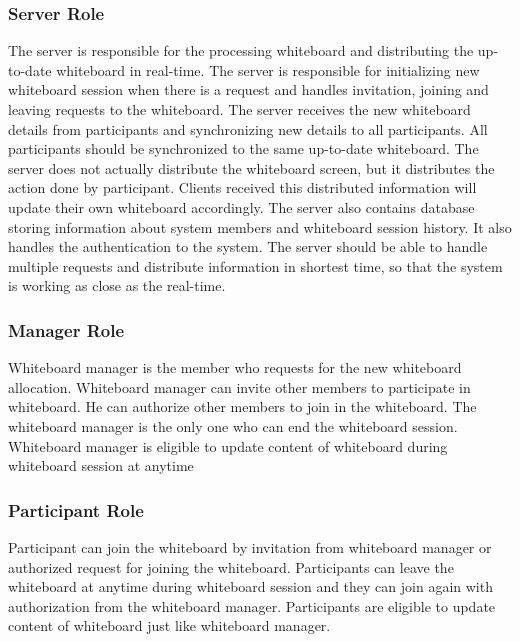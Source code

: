 \documentclass[conference]{IEEEtran}
\begin{document}
\subsubsection{Server Role}
The server is responsible for the processing whiteboard and distributing the up-to-date whiteboard in real-time. The server is responsible for initializing new whiteboard session when there is a request and handles invitation, joining and leaving requests to the whiteboard. The server receives the new whiteboard details from participants and synchronizing new details to all participants. All participants should be synchronized to the same up-to-date whiteboard. The server does not actually distribute the whiteboard screen, but it distributes the action done by participant. Clients received this distributed information will update their own whiteboard accordingly. The server also contains database storing information about system members and whiteboard session history. It also handles the authentication to the system. The server should be able to handle multiple requests and distribute information in shortest time, so that the system is working as close as the real-time.

\subsubsection{Manager Role}
Whiteboard manager is the member who requests for the new whiteboard allocation. Whiteboard manager can invite other members to participate in whiteboard. He can authorize other members to join in the whiteboard. The whiteboard manager is the only one who can end the whiteboard session. Whiteboard manager is eligible to update content of whiteboard during whiteboard session at anytime

\subsubsection{Participant Role}
Participant can join the whiteboard by invitation from whiteboard manager or authorized request for joining the whiteboard. Participants can leave the whiteboard at anytime during whiteboard session and they can join again with authorization from the whiteboard manager. Participants are eligible to update content of whiteboard just like whiteboard manager.

\end{document}
